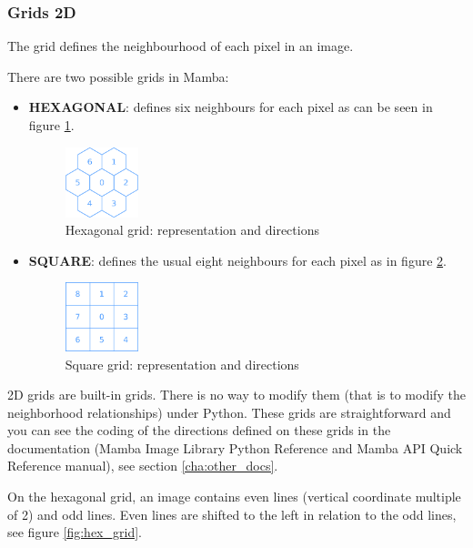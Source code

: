 \documentclass[a4paper,10pt,oneside]{article}
\begin{document}
\subsubsection{Grids 2D}
\label{cha:grid2D}

The grid defines the neighbourhood of each pixel in an image.

There are two possible grids in Mamba:

\begin{itemize}
\item \textbf{HEXAGONAL}: defines six neighbours for each pixel as can be seen in 
figure \ref{fig:hxgriddir}.

\begin{figure}
\centering
\includegraphics[width=0.2\textwidth]{figures/hexa_grid.pdf}
\caption{Hexagonal grid: representation and directions}
\label{fig:hxgriddir}
\end{figure}

\item \textbf{SQUARE}: defines the usual eight neighbours for each pixel as
in figure \ref{fig:sqgriddir}.

\begin{figure}
\centering
\includegraphics[width=0.2\textwidth]{figures/square_grid.pdf}
\caption{Square grid: representation and directions}
\label{fig:sqgriddir}
\end{figure}

\end{itemize}

2D grids are built-in grids. There is no way to modify them (that is to modify the neighborhood
relationships) under Python. These grids are straightforward and you can see the coding of the directions
defined on these grids in the documentation (Mamba Image Library Python Reference and Mamba API
Quick Reference manual), see section \ref{cha:other_docs}.

On the hexagonal grid, an image contains even lines (vertical coordinate multiple of 2) and odd lines. Even lines
are shifted to the left in relation to the odd lines, see figure \ref{fig:hex_grid}.
 
\end{document}
